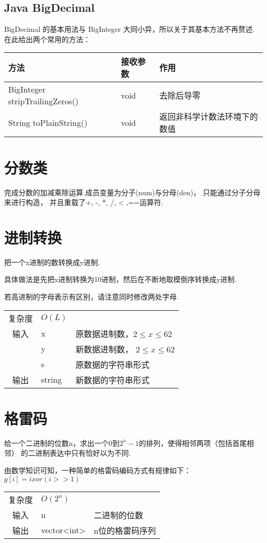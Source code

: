    \subsection{Java BigDecimal}\small
BigDecimal 的基本用法与 BigInteger 大同小异，所以关于其基本方法不再赘述.
在此给出两个常用的方法：
\begin{longtable}{|p{6.2cm}|p{2.7cm}|p{6.2cm}|}
\hline
方法 & 接收参数 & 作用 \\
\hline
 BigInteger stripTrailingZeros() & void & 去除后导零 \\
\hline
 String toPlainString() & void & 返回非科学计数法环境下的数值 \\
\hline
\end{longtable}


\section{分数类}\small
完成分数的加减乘除运算.成员变量为分子(num)与分母(den)，
只能通过分子分母来进行构造，
并且重载了+, -, *, /, < ,==运算符.



\section{进制转换}\small
把一个x进制的数转换成y进制.

具体做法是先把x进制转换为10进制，然后在不断地取模倒序转换成y进制.

若高进制的字母表示有区别，请注意同时修改两处字母.
\begin{longtable}{|c|l|l|}
复杂度 & $O(L)$ &  \\
输入 & x & 原数据进制数，$2 \leq x \leq 62$ \\
 & y & 新数据进制数， $2 \leq x \leq 62$ \\
 & s & 原数据的字符串形式 \\
输出 & string & 新数据的字符串形式 \\ 
\end{longtable}



\section{格雷码}\small
给一个二进制的位数n，求出一个0到$2^n-1$的排列，使得相邻两项（包括首尾相邻）
的二进制表达中只有恰好以为不同.

由数学知识可知，一种简单的格雷码编码方式有规律如下：$g[i] = i xor (i >> 1)$

\begin{longtable}{|c|l|l|}
复杂度 & $O(2^{n})$ &  \\
输入  & n & 二进制的位数 \\
输出 & vector<int> & n位的格雷码序列 \\ 
\end{longtable}
